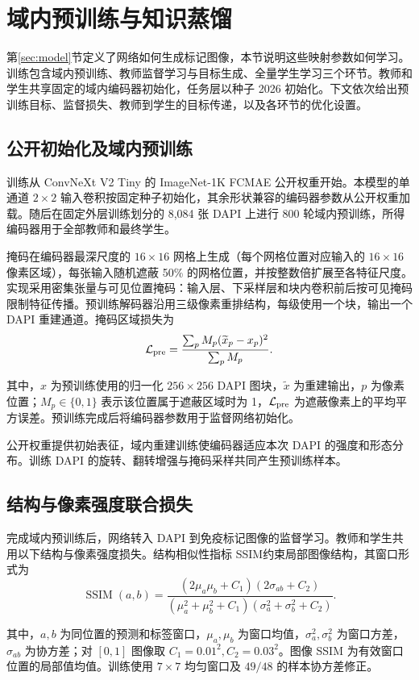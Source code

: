 \documentclass[UTF8,a4paper,zihao=5,fontset=fandol]{ctexart}
\newcommand{\op}[1]{\operatorname{#1}}
\newcommand{\sym}[1]{\par\nobreak\noindent\begin{minipage}{\linewidth}#1\end{minipage}\par}
\begin{document}
\FloatBarrier
\section{域内预训练与知识蒸馏}\label{sec:training}
第\ref{sec:model}节定义了网络如何生成标记图像，本节说明这些映射参数如何学习。训练包含域内预训练、教师监督学习与目标生成、全量学生学习三个环节。教师和学生共享固定的域内编码器初始化，任务层以种子 2026 初始化。下文依次给出预训练目标、监督损失、教师到学生的目标传递，以及各环节的优化设置。
\subsection{公开初始化及域内预训练}
训练从 ConvNeXt V2 Tiny 的 ImageNet-1K FCMAE 公开权重开始\cite{convnext}。本模型的单通道 $2\times2$ 输入卷积按固定种子初始化，其余形状兼容的编码器参数从公开权重加载。随后在固定外层训练划分的 8,084 张 DAPI 上进行 800 轮域内预训练，所得编码器用于全部教师和最终学生。

掩码在编码器最深尺度的 $16\times16$ 网格上生成（每个网格位置对应输入的 $16\times16$ 像素区域），每张输入随机遮蔽 50\% 的网格位置，并按整数倍扩展至各特征尺度。实现采用密集张量与可见位置掩码：输入层、下采样层和块内卷积前后按可见掩码限制特征传播。预训练解码器沿用三级像素重排结构，每级使用一个块，输出一个 DAPI 重建通道。掩码区域损失为
\begin{equation}
\mathcal L_{\rm pre}=\frac{\sum_p M_p(\widetilde x_p-x_p)^2}
{\sum_p M_p}.
\label{eq:pretrain}
\end{equation}
\sym{其中，$x$ 为预训练使用的归一化 $256\times256$ DAPI 图块，$\widetilde x$ 为重建输出，$p$ 为像素位置；$M_p\in\{0,1\}$ 表示该位置属于遮蔽区域时为 1，$\mathcal L_{\rm pre}$ 为遮蔽像素上的平均平方误差。预训练完成后将编码器参数用于监督网络初始化。}
公开权重提供初始表征，域内重建训练使编码器适应本次 DAPI 的强度和形态分布。训练 DAPI 的旋转、翻转增强与掩码采样共同产生预训练样本。

\subsection{结构与像素强度联合损失}
完成域内预训练后，网络转入 DAPI 到免疫标记图像的监督学习。教师和学生共用以下结构与像素强度损失。结构相似性指标 SSIM\cite{ssim}约束局部图像结构，其窗口形式为
\begin{equation}
\op{SSIM}(a,b)=
\frac{(2\mu_a\mu_b+C_1)(2\sigma_{ab}+C_2)}
{(\mu_a^2+\mu_b^2+C_1)(\sigma_a^2+\sigma_b^2+C_2)}.
\label{eq:ssim}
\end{equation}
\sym{其中，$a,b$ 为同位置的预测和标签窗口，$\mu_a,\mu_b$ 为窗口均值，$\sigma_a^2,\sigma_b^2$ 为窗口方差，$\sigma_{ab}$ 为协方差；对 $[0,1]$ 图像取 $C_1=0.01^2,C_2=0.03^2$。图像 SSIM 为有效窗口位置的局部值均值。训练使用 $7\times7$ 均匀窗口及 $49/48$ 的样本协方差修正。}
\end{document}
